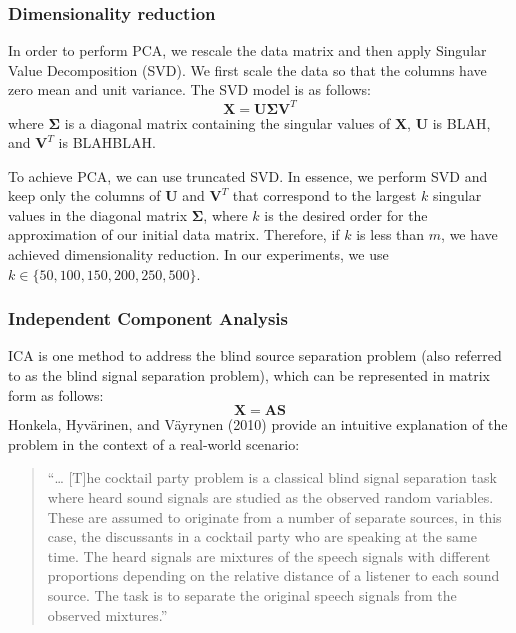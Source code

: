 \documentclass{article}
\begin{document}
\hypertarget{dimensionality-reduction}{%
\subsubsection{Dimensionality
reduction}\label{dimensionality-reduction}}

In order to perform PCA, we rescale the data matrix and then apply
Singular Value Decomposition (SVD). We first scale the data so that the
columns have zero mean and unit variance. The SVD model is as follows:
\[\mathbf{X = U \Sigma V}^T\] where \(\mathbf{\Sigma}\) is a diagonal
matrix containing the singular values of \(\mathbf{X}\), \(\mathbf{U}\)
is BLAH, and \(\mathbf{V}^T\) is BLAHBLAH.

To achieve PCA, we can use truncated SVD. In essence, we perform SVD and
keep only the columns of \(\mathbf{U}\) and \(\mathbf{V}^T\) that
correspond to the largest \(k\) singular values in the diagonal matrix
\(\mathbf{\Sigma}\), where \(k\) is the desired order for the
approximation of our initial data matrix. Therefore, if \(k\) is less
than \(m\), we have achieved dimensionality reduction. In our
experiments, we use \(k \in \{50, 100, 150, 200, 250, 500\}\).

\hypertarget{independent-component-analysis}{%
\subsubsection{Independent Component
Analysis}\label{independent-component-analysis}}

ICA is one method to address the blind source separation problem (also
referred to as the blind signal separation problem), which can be
represented in matrix form as follows: \[\mathbf{X = AS}\] Honkela,
Hyvärinen, and Väyrynen (2010) provide an intuitive explanation of the
problem in the context of a real-world scenario:

\begin{quote}
``\ldots{} {[}T{]}he cocktail party problem is a classical blind signal
separation task where heard sound signals are studied as the observed
random variables. These are assumed to originate from a number of
separate sources, in this case, the discussants in a cocktail party who
are speaking at the same time. The heard signals are mixtures of the
speech signals with different proportions depending on the relative
distance of a listener to each sound source. The task is to separate the
original speech signals from the observed mixtures.''
\end{quote}
\end{document}
